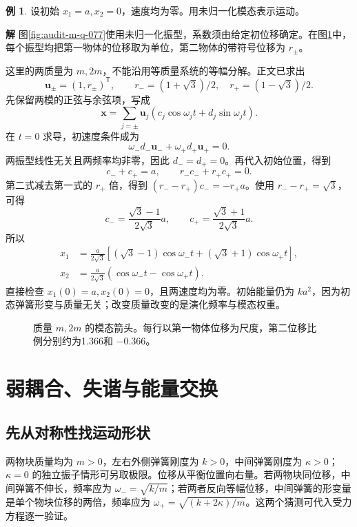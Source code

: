 \documentclass[11pt,openany,fontset=fandol]{ctexbook}
\theoremstyle{plain}\newtheorem{theorem}{定理}[chapter]\newtheorem{proposition}[theorem]{命题}
\theoremstyle{definition}\newtheorem{definition}{定义}[chapter]\newtheorem{example}{例}[chapter]
\theoremstyle{remark}\newtheorem*{remark}{说明}
\newcommand{\SolutionStart}{\par\nobreak\medskip\nobreak\noindent\textbf{解}\quad\ignorespaces}
\newenvironment{solution}{\SolutionStart}{\par\medskip}
\newcommand{\vct}[1]{\bm{#1}}\newcommand{\Rea}{\operatorname{Re}}\newcommand{\Ima}{\operatorname{Im}}
\begin{document}
\begin{example}
设初始 $x_1=a,x_2=0$，速度均为零。用未归一化模态表示运动。
\end{example}

\begin{solution}
图\ref{fig:audit-m-q-077}使用未归一化振型，系数须由给定初位移确定。在图\ref{fig:orig-065}中，每个振型均把第一物体的位移取为单位，第二物体的带符号位移为 $r_\pm$。

这里的两质量为 $m,2m$，不能沿用等质量系统的等幅分解。正文已求出
\[
\vct u_\pm=(1,r_\pm)^{\mathsf T},\qquad
r_-=(1+\sqrt3)/2,\quad r_+=(1-\sqrt3)/2.
\]
先保留两模的正弦与余弦项，写成
\[
\vct x=\sum_{j=\pm}\vct u_j(c_j\cos\omega_jt+d_j\sin\omega_jt).
\]
在 $t=0$ 求导，初速度条件成为
\[
\omega_-d_-\vct u_-+\omega_+d_+\vct u_+=0.
\]
两振型线性无关且两频率均非零，因此 $d_-=d_+=0$。再代入初始位置，得到
\[
c_-+c_+=a,\qquad r_-c_-+r_+c_+=0.
\]
第二式减去第一式的 $r_+$ 倍，得到 $(r_--r_+)c_-=-r_+a$。使用 $r_--r_+=\sqrt3$，可得
\[
c_-=\frac{\sqrt3-1}{2\sqrt3}a,\qquad
c_+=\frac{\sqrt3+1}{2\sqrt3}a.
\]
所以
\begin{align*}
x_1&=\frac a{2\sqrt3}[(\sqrt3-1)\cos\omega_-t+(\sqrt3+1)\cos\omega_+t],\\
x_2&=\frac a{2\sqrt3}(\cos\omega_-t-\cos\omega_+t).
\end{align*}
直接检查 $x_1(0)=a,x_2(0)=0$，且两速度均为零。初始能量仍为 $ka^2$，因为初态弹簧形变与质量无关；改变质量改变的是演化频率与模态权重。

\begin{figure}[H]\centering
{}
\caption{质量 $m,2m$ 的模态箭头。每行以第一物体位移为尺度，第二位移比例分别约为1.366和 $-0.366$。}
\label{fig:orig-065}
\end{figure}

\end{solution}

\section{弱耦合、失谐与能量交换}
\subsection{先从对称性找运动形状}
两物块质量均为 $m>0$，左右外侧弹簧刚度为 $k>0$，中间弹簧刚度为 $\kappa>0$；$\kappa=0$ 的独立振子情形可另取极限。位移从平衡位置向右量。若两物块同位移，中间弹簧不伸长，频率应为 $\omega_-=\sqrt{k/m}$；若两者反向等幅位移，中间弹簧的形变量是单个物块位移的两倍，频率应为 $\omega_+=\sqrt{(k+2\kappa)/m}$。这两个猜测可代入受力方程逐一验证。
\end{document}
